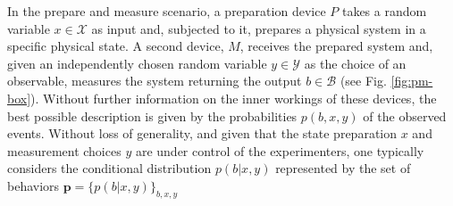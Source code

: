 \documentclass[a4paper,preprintnumbers,floatfix,superscriptaddress,pra,twocolumn,showpacs,notitlepage,longbibliography]{revtex4-2}
\begin{document}
    In the prepare and measure scenario, a preparation device $P$ takes a random variable $x \in \mathcal{X}$ as input and, subjected to it, prepares a physical system in a specific physical state. A second device, $M$, receives the prepared system and, given an independently chosen random variable $y \in \mathcal{Y}$ as the choice of an observable, measures the system returning the output $b \in \mathcal{B}$ (see Fig. \ref{fig:pm-box}). Without further information on the inner workings of these devices, the best possible description is given by the probabilities $p(b,x,y)$ of the observed events. Without loss of generality, and given that the state preparation $x$ and measurement choices $y$ are under control of the experimenters, one typically considers the conditional distribution $p(b\vert x,y)$ represented by the set of behaviors  $\mathbf{p} = \{ p(b \vert x, y) \}_{b, x, y}$
    
\end{document}
